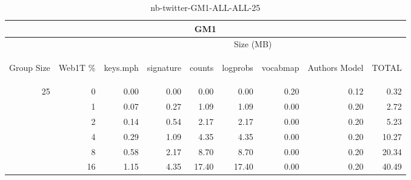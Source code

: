 \begin{center}
\begin{table}[htbp] 
 \begin{center}
\begin{tabular}{ | r | r | r | r | r | r | r | r | r |}
\hline
\multicolumn{9}{|c|}{GM1}\\
\hline
 & & \multicolumn{7}{|c|}{Size (MB)}\\ \cline{3-9}
\begin{sideways}Group Size\end{sideways} & \begin{sideways}Web1T \% \end{sideways} & \begin{sideways}keys.mph\end{sideways} & \begin{sideways}signature\end{sideways} & \begin{sideways}counts\end{sideways} & \begin{sideways}logprobs\end{sideways} & \begin{sideways}vocabmap\end{sideways} & \begin{sideways}Authors Model \end{sideways} & \begin{sideways}TOTAL\end{sideways}\\
\hline
\multirow{5}{*}{25}
 & 0 & 0.00 & 0.00 & 0.00 & 0.00 & 0.20 & 0.12 & 0.32\\ \cline{2-9}
 & 1 & 0.07 & 0.27 & 1.09 & 1.09 & 0.00 & 0.20 & 2.72\\ \cline{2-9}
 & 2 & 0.14 & 0.54 & 2.17 & 2.17 & 0.00 & 0.20 & 5.23\\ \cline{2-9}
 & 4 & 0.29 & 1.09 & 4.35 & 4.35 & 0.00 & 0.20 & 10.27\\ \cline{2-9}
 & 8 & 0.58 & 2.17 & 8.70 & 8.70 & 0.00 & 0.20 & 20.34\\ \cline{2-9}
 & 16 & 1.15 & 4.35 & 17.40 & 17.40 & 0.00 & 0.20 & 40.49\\ \cline{2-9}
\hline
\end{tabular}
\caption{nb-twitter-GM1-ALL-ALL-25}
\label{table:nb-twitter-GM1-ALL-ALL-25}
\end{center}
 \end{table}
\end{center}

